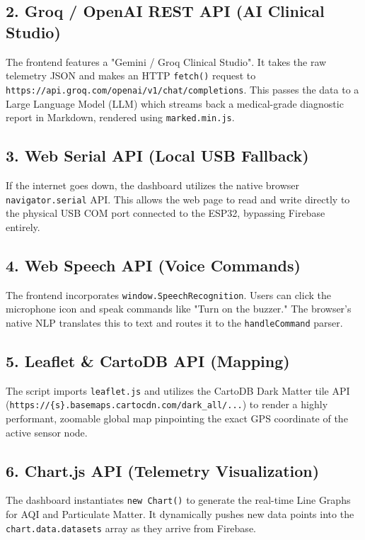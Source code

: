 \documentclass[11pt,a4paper]{article}
\begin{document}
\subsection{2. Groq / OpenAI REST API (AI Clinical Studio)}
The frontend features a "Gemini / Groq Clinical Studio". It takes the raw telemetry JSON and makes an HTTP \texttt{fetch()} request to \texttt{https://api.groq.com/openai/v1/chat/completions}. This passes the data to a Large Language Model (LLM) which streams back a medical-grade diagnostic report in Markdown, rendered using \texttt{marked.min.js}.

\subsection{3. Web Serial API (Local USB Fallback)}
If the internet goes down, the dashboard utilizes the native browser \texttt{navigator.serial} API. This allows the web page to read and write directly to the physical USB COM port connected to the ESP32, bypassing Firebase entirely.

\subsection{4. Web Speech API (Voice Commands)}
The frontend incorporates \texttt{window.SpeechRecognition}. Users can click the microphone icon and speak commands like "Turn on the buzzer." The browser's native NLP translates this to text and routes it to the \texttt{handleCommand} parser.

\subsection{5. Leaflet \& CartoDB API (Mapping)}
The script imports \texttt{leaflet.js} and utilizes the CartoDB Dark Matter tile API (\texttt{https://\{s\}.basemaps.cartocdn.com/dark\_all/...}) to render a highly performant, zoomable global map pinpointing the exact GPS coordinate of the active sensor node.

\subsection{6. Chart.js API (Telemetry Visualization)}
The dashboard instantiates \texttt{new Chart()} to generate the real-time Line Graphs for AQI and Particulate Matter. It dynamically pushes new data points into the \texttt{chart.data.datasets} array as they arrive from Firebase.
\end{document}
